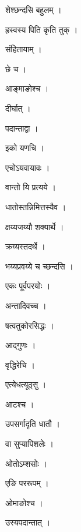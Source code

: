 \documentclass[10pt, openany]{book}
\begin{document}
\noindent शेश्छन्दसि बहुलम् ।

\noindent ह्रस्वस्य पिति कृति तुक् ।

\noindent संहितायाम् ।

\noindent छे च ।

\noindent आङ्माङोश्च ।

\noindent दीर्घात् ।

\noindent पदान्ताद्वा ।

\noindent इको यणचि ।

\noindent एचोऽयवायावः ।

\noindent वान्तो यि प्रत्यये ।

\noindent धातोस्तन्निमित्तस्यैव ।

\noindent क्षय्यजय्यौ शक्यार्थे ।

\noindent क्रय्यस्तदर्थे ।

\noindent भय्यप्रवय्ये च च्छन्दसि ।

\noindent एकः पूर्वपरयोः ।

\noindent अन्तादिवच्च ।

\noindent षत्वतुकोरसिद्धः ।

\noindent आद्गुणः ।

\noindent वृद्धिरेचि ।

\noindent एत्येधत्यूठ्सु ।

\noindent आटश्च ।

\noindent उपसर्गादृति धातौ ।

\noindent वा सुप्यापिशलेः ।

\noindent ओतोऽम्शसोः ।

\noindent एङि पररूपम् ।

\noindent ओमाङोश्च ।

\noindent उस्यपदान्तात् ।
\end{document}
